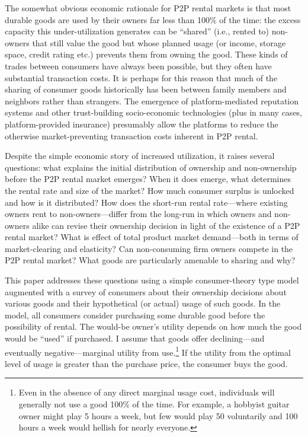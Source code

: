 \documentclass[11pt]{article}
\begin{document}
The somewhat obvious economic rationale for P2P rental markets is that most durable goods are used by their owners far less than 100\% of the time: the excess capacity this under-utilization generates can be ``shared'' (i.e., rented to) non-owners that still value the good but whose planned usage (or income, storage space, credit rating etc.) prevents them from owning the good. 
These kinds of trades between consumers have always been possible, but they often have substantial transaction costs.
It is perhaps for this reason that much of the sharing of consumer goods historically has been between family members and neighbors rather than strangers. 
The emergence of platform-mediated reputation systems and other trust-building socio-economic technologies (plus in many cases, platform-provided insurance) presumably allow the platforms to reduce the otherwise market-preventing transaction costs inherent in P2P rental. 

Despite the simple economic story of increased utilization, it raises several questions:
what explains the initial distribution of ownership and non-ownership before the P2P rental market emerges?
When it does emerge, what determines the rental rate and size of the market? 
How much consumer surplus is unlocked and how is it distributed? 
How does the short-run rental rate---where existing owners rent to non-owners---differ from the long-run in which owners and non-owners alike can revise their ownership decision in light of the existence of a P2P rental market?  
What is effect of total product market demand---both in terms of market-clearing and elasticity?  
Can non-consuming firm owners compete in the P2P rental market? 
What goods are particularly amenable to sharing and why?
  
This paper addresses these questions using a simple consumer-theory type model augmented with a survey of consumers about their ownership decisions about various goods and their hypothetical (or actual) usage of such goods. 
In the model, all consumers consider purchasing some durable good before the possibility of rental.   
The would-be owner's utility depends on how much the good would be ``used'' if purchased.
I assume that goods offer declining---and eventually negative---marginal utility from use.\footnote{Even in the absence of any direct marginal usage cost, individuals will generally not use a good 100\% of the time. 
For example, a hobbyist guitar owner might play 5 hours a week, but few would play 50 voluntarily and 100 hours a week would hellish for nearly everyone.} 
If the utility from the optimal level of usage is greater than the purchase price, the consumer buys the good. 
\end{document}
